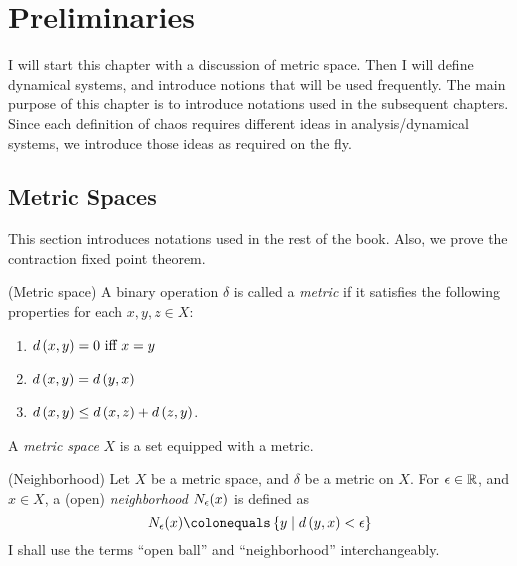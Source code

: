 \documentclass[12pt,twoside,draft]{book}
\begin{document}
\chapter{Preliminaries}
\label{chap:prelim}
I will start this chapter with a discussion of metric space.
Then I will define dynamical systems, and introduce notions that will be used frequently.
The main purpose of this chapter is to introduce notations used in the subsequent chapters. 
Since each definition of chaos requires different ideas in analysis/dynamical systems, we introduce those ideas as required on the fly.

\section{Metric Spaces}
This section introduces notations used in the rest of the book.
Also, we prove the contraction fixed point theorem.

\begin{definition}
  (Metric space)
  A binary operation $\delta$ is called a \textit{metric} if it satisfies the following properties for each $x,y,z \in X$:
  \begin{enumerate}
    \item $d\left( x,y \right) = 0 \mbox{ iff } x = y$
    \item $d\left( x,y \right) = d\left( y,x \right)$
    \item $d\left( x,y \right) \leq d\left( x,z \right) + d\left( z,y \right)$.
  \end{enumerate}
  A \textit{metric space} $X$ is a set equipped with a metric.
\end{definition}
\begin{definition}
  (Neighborhood)
  Let $X$ be a metric space, and $\delta$ be a metric on $X$.
  For $\epsilon \in \mathbb{R}$, and $x \in X$, a (open) \textit{neighborhood} $N_{\epsilon}(x)$ is defined as 
  \begin{equation*}
    \oball{\epsilon}{x} \ceq \setst{y}{\metric{y,x} < \epsilon}
  \end{equation*}
  I shall use the terms ``open ball'' and ``neighborhood'' interchangeably.
\end{definition}
\end{document}

